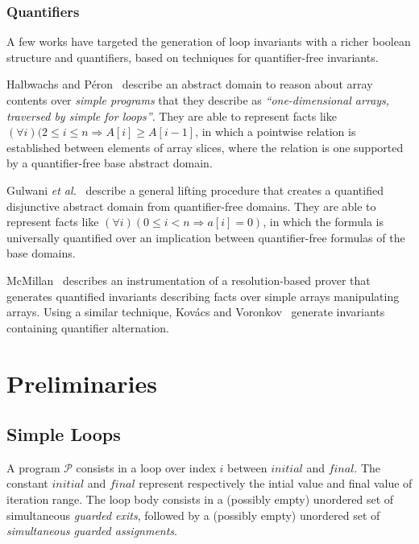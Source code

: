 \documentclass[a4paper,10pt]{article}
\newcommand{\etal}{\textit{et al.}\xspace}
\newcommand{\prog}{\ensuremath{\mathcal{P}}\xspace}
\newcommand{\idx}{\ensuremath{i}\xspace}
\newcommand{\idxinitial}{\ensuremath{\mathit{initial}}\xspace}
\newcommand{\idxfinal}{\ensuremath{\mathit{final}}\xspace}
\newcommand{\impl}{\ensuremath{\Longrightarrow}}
\begin{document}
\subsubsection*{Quantifiers}

A few works have targeted the generation of loop invariants with a richer
boolean structure and quantifiers, based on techniques for quantifier-free
invariants.

Halbwachs and Péron~\cite{halbwachs:2008:pldi} describe an abstract domain to
reason about array contents over \textit{simple programs} that they describe as
\textit{``one-dimensional arrays, traversed by simple for loops''}. They are
able to represent facts like $(\forall i)(2 \leq i \leq n \impl A[i] \geq
A[i−1]$, in which a pointwise relation is established between elements of array
slices, where the relation is one supported by a quantifier-free base abstract
domain.

Gulwani \etal~\cite{gulwani:2008:popl} describe a general lifting procedure
that creates a quantified disjunctive abstract domain from quantifier-free
domains. They are able to represent facts like $(\forall i)(0 \leq i < n \impl
a[i] = 0)$, in which the formula is universally quantified over an implication
between quantifier-free formulas of the base domains.

McMillan~\cite{mcmillan:2008:tacas} describes an instrumentation of a
resolution-based prover that generates quantified invariants describing facts
over simple arrays manipulating arrays. Using a similar technique, Kov\'acs and
Voronkov~\cite{kovacs:2009:fli} generate invariants containing quantifier
alternation.

\section{Preliminaries}

\subsection{Simple Loops}
\label{sec:simple-loops}
A program \prog consists in a loop over index \idx between \idxinitial and
\idxfinal.  The constant \idxinitial and \idxfinal represent respectively the
intial value and final value of iteration range.  The loop body consists in a
(possibly empty) unordered set of simultaneous \textit{guarded exits}, followed
by a (possibly empty) unordered set of \textit{simultaneous guarded
  assignments}.

\newcommand{\expr}{\ensuremath{\mathit{expr}}}
\newcommand{\assign}{\ensuremath{\mathit{assign}}}
\newcommand{\gexit}{\ensuremath{\mathit{guardexit}}}
\newcommand{\gassign}{\ensuremath{\mathit{guardassign}}}
\newcommand{\location}{\ensuremath{\mathit{location}}}
\end{document}
